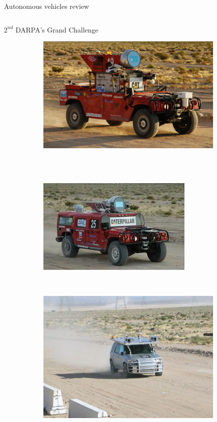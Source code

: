 \begin{frame}{Autonomous vehicles review}
\begin{columns}[T]
\begin{center}
\begin{overlayarea}{\textwidth}{\textheight}
{\begin{block}{$2^{nd}$ DARPA's Grand Challenge}
\begin{figure}[t]
\begin{subfigure}[b]{0.4\textwidth}
		      \includegraphics[width=\textwidth]{Sandstorm}
		    \end{subfigure}
		    \\~\\
		    \begin{subfigure}[b]{0.4\textwidth}
		      \includegraphics[width=\textwidth]{h1ghlander}
		    \end{subfigure}
		    ~
		    \begin{subfigure}[b]{0.4\textwidth}
		      \includegraphics[width=\textwidth]{kat5}

\end{subfigure}
\end{figure}
\end{block}}
\end{overlayarea}
\end{center}
\end{columns}
\end{frame}
